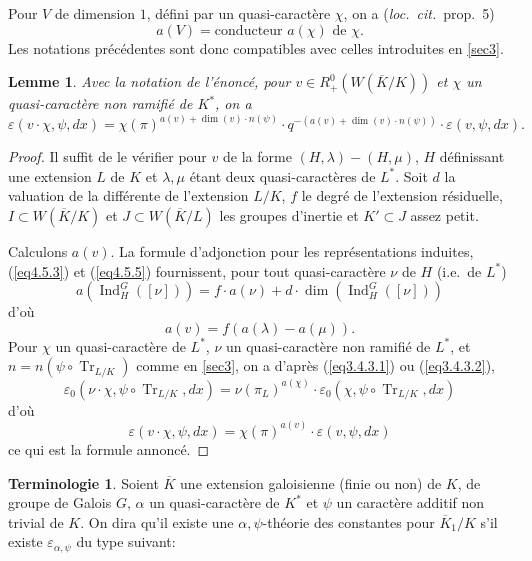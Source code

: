 \documentclass[11pt,a4paper]{amsart}
\theoremstyle{plain}
\newtheorem{lemma}[theorem]{Lemme}
\theoremstyle{definition}
\newtheorem{terminology}[theorem]{Terminologie}
\DeclareMathOperator{\Ind}{Ind}
\DeclareMathOperator{\Tr}{Tr}
\def\dim{\mathop{\mathrm{dim}}\nolimits}
\newcommand{\ov}[1]{\overline{#1}}
\newcommand{\eps}{\varepsilon}
\begin{document}
Pour $V$ de dimension $1$, d\'efini par un quasi-caract\`ere $\chi$, on a (\textit{loc.~cit.}~prop.~5)
\begin{equation}\label{eq4.5.5}
a(V) = \text{conducteur } a(\chi) \text{ de } \chi.
\end{equation}
Les notations pr\'ec\'edentes sont donc compatibles avec celles introduites en \ref{sec3}.

\begin{lemma}\label{lem4.5}
Avec la notation de l'\'enonc\'e, pour $v \in R_{+}^{0}(W(\ov{K}/K))$ et $\chi$ un quasi-caract\`ere non ramifi\'e de $K^{*}$, on a
\[
\eps(v \cdot \chi, \psi, dx) = \chi(\pi)^{a(v) + \dim(v) \cdot n(\psi)} \cdot q^{-(a(v)+\dim(v) \cdot n(\psi))} \cdot \eps(v,\psi,dx).
\]
\end{lemma}

\begin{proof}
Il suffit de le v\'erifier pour $v$ de la forme $(H,\lambda) - (H,\mu)$, $H$ d\'efinissant une extension $L$ de $K$ et $\lambda, \mu$ \'etant deux quasi-caract\`eres de $L^{*}$. Soit $d$ la valuation de la diff\'erente de l'extension $L/K$, $f$ le degr\'e de l'extension r\'esiduelle, $I \subset W(\ov{K}/K)$ et $J \subset W(\ov{K}/L)$ les groupes d'inertie et $K' \subset J$ assez petit.

Calculons $a(v)$. La formule d'adjonction pour les repr\'esentations induites, (\ref{eq4.5.3}) et (\ref{eq4.5.5}) fournissent, pour tout quasi-caract\`ere $\nu$ de $H$ (i.e.~de $L^{*}$)
\[
a(\Ind_{H}^{G}([\nu])) = f \cdot a(\nu) + d \cdot \dim(\Ind_{H}^{G}([\nu]))
\]
d'o\`u
\[
a(v) = f(a(\lambda) - a(\mu)).
\]
Pour $\chi$ un quasi-caract\`ere de $L^{*}$, $\nu$ un quasi-caract\`ere non ramifi\'e de $L^{*}$, et $n = n(\psi \circ \Tr_{L/K})$ comme en \ref{sec3}, on a d'apr\`es (\ref{eq3.4.3.1}) ou (\ref{eq3.4.3.2}),
\[
\eps_{0}(\nu \cdot \chi, \psi \circ \Tr_{L/K}, dx) = \nu(\pi_{L})^{a(\chi)} \cdot \eps_{0}(\chi, \psi \circ \Tr_{L/K}, dx)
\]
d'o\`u
\[
\eps(v \cdot \chi, \psi, dx) = \chi(\pi)^{a(v)} \cdot \eps(v, \psi, dx)
\]
ce qui est la formule annonc\'e.
\end{proof}

\begin{terminology}
Soient $\ov{K}$ une extension galoisienne (finie ou non) de $K$, de groupe de Galois $G$, $\alpha$ un quasi-caract\`ere de $K^{*}$ et $\psi$ un caract\`ere additif non trivial de $K$. On dira qu'il existe une $\alpha,\psi$-th\'eorie des constantes pour $\ov{K}_{1}/K$ s'il existe $\eps_{\alpha,\psi}$ du type suivant:
\end{terminology}
\end{document}
